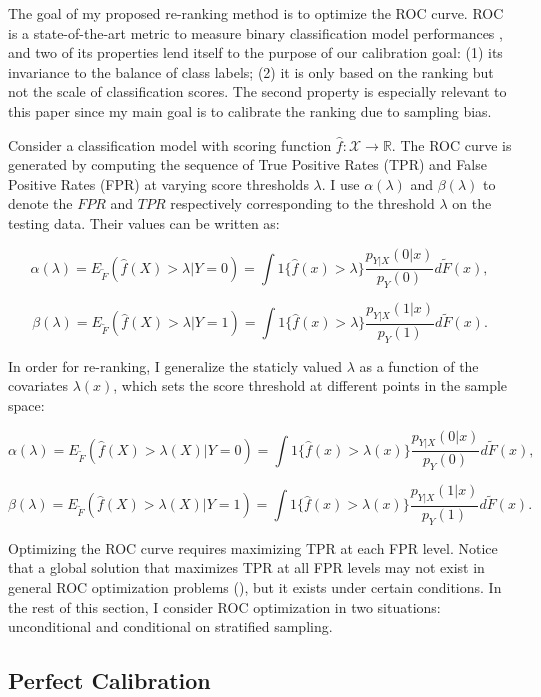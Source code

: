 \documentclass{article} %
\begin{document}
The goal of my proposed re-ranking method is to optimize the ROC curve. ROC is a state-of-the-art metric to measure binary classification model performances \cite{fawcett2006introduction}, and two of its properties lend itself to the purpose of our calibration goal: (1) its invariance to the balance of class labels; (2) it is only based on the ranking but not the scale of classification scores. The second property is especially relevant to this paper since my main goal is to calibrate the ranking due to sampling bias.

Consider a classification model with scoring function $\hat f: \mathcal X \rightarrow \mathbb R$. The ROC curve is generated by computing the sequence of True Positive Rates (TPR) and False Positive Rates (FPR) at varying score thresholds $\lambda$. I use $\alpha(\lambda)$ and $\beta(\lambda)$ to denote the $FPR$ and $TPR$ respectively corresponding to the threshold $\lambda$ on the testing data. Their values can be written as:

\[
\alpha(\lambda)=E_{\tilde F}(\hat f(X) > \lambda | Y = 0)=\int 1\{\hat f(x) > \lambda\}\frac{p_{Y|X}(0|x)}{p_Y(0)}d\tilde F(x),
\]

\[
\beta(\lambda)=E_{\tilde F}(\hat f(X) > \lambda | Y = 1)=\int 1\{\hat f(x) > \lambda\}\frac{p_{Y|X}(1|x)}{p_Y(1)}d\tilde F(x).
\]

In order for re-ranking, I generalize the staticly valued $\lambda$ as a function of the covariates $\lambda(x)$, which sets the score threshold at different points in the sample space: 

\[
\alpha(\lambda)=E_{\tilde F}(\hat f(X) > \lambda(X) | Y = 0)=\int 1\{\hat f(x) > \lambda(x)\}\frac{p_{Y|X}(0|x)}{p_Y(0)}d\tilde F(x),
\]

\[
\beta(\lambda)=E_{\tilde F}(\hat f(X) > \lambda(X) | Y = 1)=\int 1\{\hat f(x) > \lambda(x)\}\frac{p_{Y|X}(1|x)}{p_Y(1)}d\tilde F(x).
\]

Optimizing the ROC curve requires maximizing TPR at each FPR level. Notice that a global solution that maximizes TPR at all FPR levels may not exist in general ROC optimization problems (\cite{fawcett2006introduction}), but it exists under certain conditions. In the rest of this section, I consider ROC optimization in two situations: unconditional and conditional on stratified sampling. 

\subsection{Perfect Calibration}\label{sec:perfectcalib}
\end{document}

